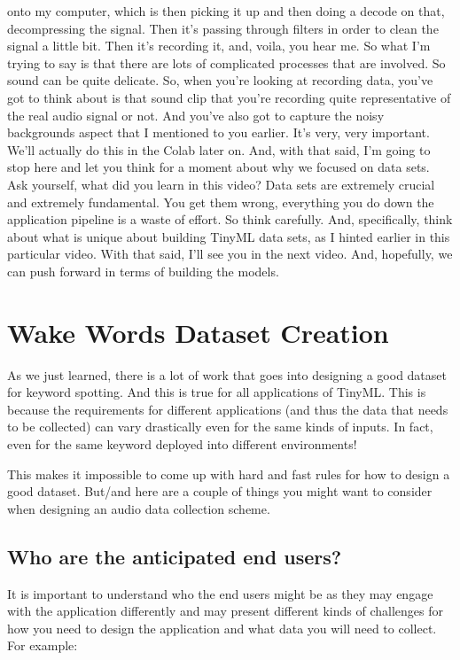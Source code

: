 onto my computer, which is then picking it up and then doing a decode on that,
decompressing the signal.
Then it's passing through filters in order to clean the signal a little bit.
Then it's recording it, and, voila, you hear me.
So what I'm trying to say is that there are lots of complicated processes
that are involved.
So sound can be quite delicate.
So, when you're looking at recording data,
you've got to think about is that sound clip that you're
recording quite representative of the real audio signal or not.
And you've also got to capture the noisy backgrounds
aspect that I mentioned to you earlier.
It's very, very important.
We'll actually do this in the Colab later on.
And, with that said, I'm going to stop here and let
you think for a moment about why we focused on data sets.
Ask yourself, what did you learn in this video?
Data sets are extremely crucial and extremely fundamental.
You get them wrong, everything you do down the application pipeline
is a waste of effort.
So think carefully.
And, specifically, think about what is unique about building TinyML data sets,
as I hinted earlier in this particular video.
With that said, I'll see you in the next video.
And, hopefully, we can push forward in terms of building the models.


\section{Wake Words Dataset Creation}

As we just learned, there is a lot of work that goes into designing a good dataset for keyword spotting. And this is true for all applications of TinyML. This is because the requirements for different applications (and thus the data that needs to be collected) can vary drastically even for the same kinds of inputs. In fact, even for the same keyword deployed into different environments!

This makes it impossible to come up with hard and fast rules for how to design a good dataset. But/and here are a couple of things you might want to consider when designing an audio data collection scheme.

\subsection{Who are the anticipated end users?}

It is important to understand who the end users might be as they may engage with the application differently and may present different kinds of challenges for how you need to design the application and what data you will need to collect. For example:

